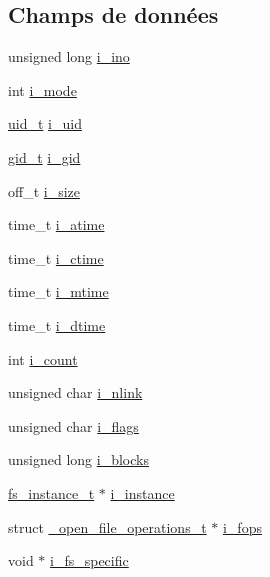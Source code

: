\subsection*{Champs de données}
\begin{DoxyCompactItemize}
\item 
unsigned long \hyperlink{struct__inode__t_aba602b843ba63a32ca3950dbaf7e959c}{i\-\_\-ino}
\item 
int \hyperlink{struct__inode__t_acead4732b6c22ef17ada59203509e728}{i\-\_\-mode}
\item 
\hyperlink{kstat_8h_af2306308627701b66dc6f3babe821ab4}{uid\-\_\-t} \hyperlink{struct__inode__t_a7ddcb65050ac0b4c9cfbacd495d56f4b}{i\-\_\-uid}
\item 
\hyperlink{kstat_8h_aa7352f1065fe606194d792e2b292cf83}{gid\-\_\-t} \hyperlink{struct__inode__t_a95d052a6e9b1b1e4f6837fa0f33b393e}{i\-\_\-gid}
\item 
off\-\_\-t \hyperlink{struct__inode__t_aed37b31c96c90873201abfc8b4b3e463}{i\-\_\-size}
\item 
time\-\_\-t \hyperlink{struct__inode__t_a01f50c6c44a3b50e4414a794643b741f}{i\-\_\-atime}
\item 
time\-\_\-t \hyperlink{struct__inode__t_a73ee1e604547b74b8e1045fd4f6699b6}{i\-\_\-ctime}
\item 
time\-\_\-t \hyperlink{struct__inode__t_a331d724391efce2f89aeb1a503ae5c43}{i\-\_\-mtime}
\item 
time\-\_\-t \hyperlink{struct__inode__t_a393de4c58241168fdf397ab8421a3539}{i\-\_\-dtime}
\item 
int \hyperlink{struct__inode__t_a8ea768d56d01e010bc0c809bc38dbb28}{i\-\_\-count}
\item 
unsigned char \hyperlink{struct__inode__t_a929fc1e6837d02a2525027a121b4e67e}{i\-\_\-nlink}
\item 
unsigned char \hyperlink{struct__inode__t_a36ff48a57a9e483d74682972d31ef46c}{i\-\_\-flags}
\item 
unsigned long \hyperlink{struct__inode__t_a92ebe4c1e93af9fba4efae4d07e14858}{i\-\_\-blocks}
\item 
\hyperlink{vfs_8h_a0eefa9aac35a5462ebf1e038992ca860}{fs\-\_\-instance\-\_\-t} $\ast$ \hyperlink{struct__inode__t_affefc88b22f45e2ec8340d582486d0f2}{i\-\_\-instance}
\item 
struct \hyperlink{struct__open__file__operations__t}{\-\_\-open\-\_\-file\-\_\-operations\-\_\-t} $\ast$ \hyperlink{struct__inode__t_acf149d7d1601f78142b1eec480badf7e}{i\-\_\-fops}
\item 
void $\ast$ \hyperlink{struct__inode__t_a54e34439c448c46bae90fd040dadc5c0}{i\-\_\-fs\-\_\-specific}
\end{DoxyCompactItemize}


